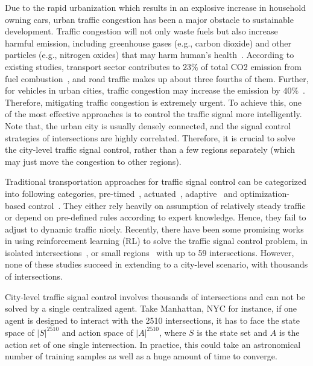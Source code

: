 
Due to the rapid urbanization which results in an explosive increase in household owning cars, urban traffic congestion has been a major obstacle to sustainable development. Traffic congestion will not only waste fuels but also increase harmful emission, including greenhouse gases (e.g., carbon dioxide) and other particles (e.g., nitrogen oxides) that may harm human's health~\cite{bharadwaj2017impact}. According to existing studies, transport sector contributes to $23\%$ of total CO2 emission from fuel combustion~\cite{grote2016including}, and road traffic makes up about three fourths of them. Further, for vehicles in urban cities, traffic congestion may increase the emission by $40\%$~\cite{grote2016including}. Therefore, mitigating traffic congestion is extremely urgent. To achieve this, one of the most effective approaches is to control the traffic signal more intelligently. Note that, the urban city is usually densely connected, and the signal control strategies of intersections are highly correlated. Therefore, it is crucial to solve the city-level traffic signal control, rather than a few regions separately (which may just move the congestion to other regions).


Traditional transportation approaches for traffic signal control can be categorized into following categories, pre-timed~\cite{koonce2008traffic}, actuated~\cite{cools2013self}, adaptive~\cite{lowrie1990scats,hunt1981scoot} and optimization-based control~\cite{varaiya2013max}. They either rely heavily on assumption of relatively steady traffic or depend on pre-defined rules according to expert knowledge. Hence, they fail to adjust to dynamic traffic nicely. Recently, there have been some promising works in using reinforcement learning (RL) to solve the traffic signal control problem, in isolated intersections~\cite{wei2018intellilight}, or small regions~\cite{ElAb12,van2016coordinated,nishi2018traffic} with up to 59 intersections. However, none of these studies succeed in extending to a city-level scenario, with thousands of intersections.

City-level traffic signal control involves thousands of intersections and can not be solved by a single centralized agent. Take Manhattan, NYC for instance, if one agent is designed to interact with the 2510 intersections, it has to face the state space of $|S|^{2510}$ and action space of $|A|^{2510}$, where $S$ is the state set and $A$ is the action set of one single intersection. In practice, this could take an astronomical number of training samples as well as a huge amount of time to converge. 

